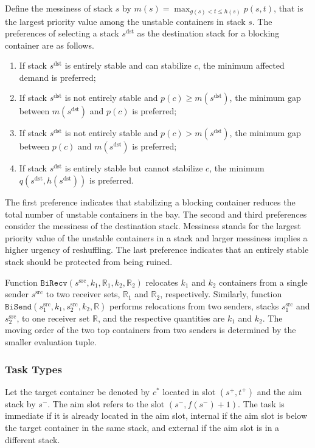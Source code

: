 \documentclass{article}
\newcommand{\mss}{s^\mathrm{src}}
\newcommand{\mds}{s^\mathrm{dst}}
\begin{document}
Define the messiness of stack $s$ by $m(s)=\max_{g(s)<t\le h(s)}p(s,t)$, that is the largest priority value among the unstable containers in stack $s$. The preferences of selecting a stack $\mds$ as the destination stack for a blocking container are as follows.
\begin{enumerate}[noitemsep]
\item If stack $\mds$ is entirely stable and can stabilize $c$, the minimum affected demand is preferred;
\item If stack $\mds$ is not entirely stable and $p(c)\ge m(\mds)$, the minimum gap between $m(\mds)$ and $p(c)$ is preferred;
\item If stack $\mds$ is not entirely stable and $p(c)> m(\mds)$, the minimum gap between $p(c)$ and $m(\mds)$ is preferred;
\item If stack $\mds$ is entirely stable but cannot stabilize $c$, the minimum $q(\mds,h(\mds))$ is preferred.
\end{enumerate}

The first preference indicates that stabilizing a blocking container reduces the total number of unstable containers in the bay. The second and third preferences consider the messiness of the destination stack. Messiness stands for the largest priority value of the unstable containers in a stack and larger messiness implies a higher urgency of reshuffling. The last preference indicates that an entirely stable stack should be protected from being ruined.

Function $\mathtt{BiRecv}(\mss,k_1,\mathbb{R}_1,k_2,\mathbb{R}_2)$ relocates $k_1$ and $k_2$ containers from a single sender $\mss$ to two receiver sets, $\mathbb{R}_1$ and $\mathbb{R}_2$, respectively. Similarly, function $\mathtt{BiSend}(\mss_1, k_1,  \mss_2,  k_2,  \mathbb{R})$ performs relocations from two senders, stacks $\mss_1$ and $\mss_2$, to one receiver set $\mathbb{R}$, and the respective quantities are $k_1$ and $k_2$. The moving order of the two top containers from two senders is determined by the smaller evaluation tuple.


\subsubsection{Task Types}

Let the target container be denoted by $c^*$ located in slot $(s^+,t^+)$ and the aim stack by $s^-$. The aim slot refers to the slot $(s^-,f(s^-)+1)$. The task is {immediate} if it is already located in the aim slot, {internal} if the aim slot is below the target container in the same stack, and {external} if the aim slot is in a different stack. 
\end{document}
